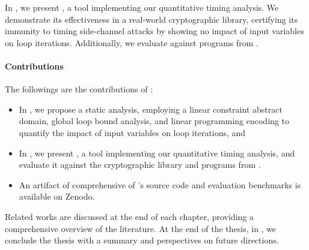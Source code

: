 In , we present \timesec,\sidenote{\timesecurl} a tool implementing our quantitative timing analysis.
We demonstrate its effectiveness in a real-world cryptographic library, certifying its immunity to timing side-channel attacks by showing no impact of input variables on loop iterations.
Additionally, we evaluate \timesec{} against programs from \svcomp.


\paragraph{Contributions}

The followings are the contributions of :

\begin{itemize}
  \item In , we propose a static analysis, employing a linear constraint abstract domain, global loop bound analysis, and linear programming encoding to quantify the impact of input variables on loop iterations, and
  \item In , we present \timesec,\sidenote{\timesecurl} a tool implementing our quantitative timing analysis, and evaluate it against the \bignum{} cryptographic library\sidenote{\bignumurl} and programs from \svcomp.\sidenote{\svcompurl}
  \item An artifact of \timesec{} comprehensive of \timesec's source code and evaluation benchmarks is available on Zenodo.\sidenote{\timeseczenodo}
\end{itemize}

\frenchdiv

Related works are discussed at the end of each chapter, providing a comprehensive overview of the literature.
At the end of the thesis, in , we conclude the thesis with a summary and perspectives on future directions.
